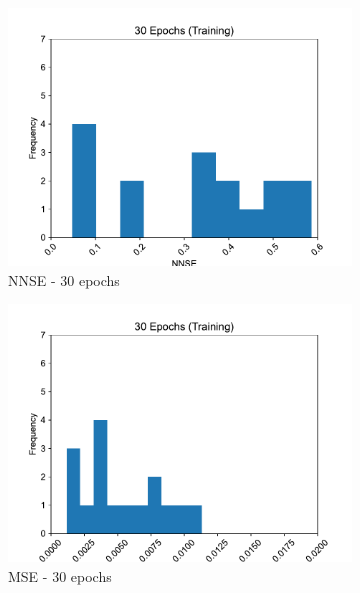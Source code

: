 \documentclass[11pt,twocolumn]{article}
\begin{document}
\begin{figure}[p]
\begin{subfigure}[b]{0.49\textwidth}
        \centering\includegraphics[width=1.0\linewidth]{images/30_training-NNSE.pdf}
        \caption{NNSE - 30 epochs}
        \label{fig:tbd3}
     \end{subfigure}
     \hfill
     \begin{subfigure}[b]{0.49\textwidth}
        \centering\includegraphics[width=1.0\linewidth]{images/30_training-MSE.pdf}
        \caption{MSE - 30 epochs}
        \label{fig:tbd4}
     \end{subfigure}
     \hfill
          \newline
     \hfill
     \begin{subfigure}[b]{0.49\textwidth}

\end{subfigure}
\end{figure}
\end{document}

